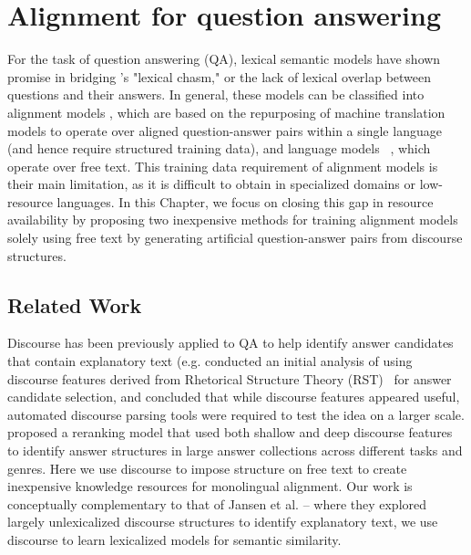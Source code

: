 

\section{Alignment for question answering}
\label{sec-naacl2015:intro}


For the task of question answering (QA), lexical semantic models have shown promise in bridging \citet{Berger:00}'s "lexical chasm," or the lack of lexical overlap between questions and their answers.  In general, these models can be classified into alignment models \citep{echihabi2003noisy,Soricut:06,Riezler:etal:2007,Surdeanu:11,yao2013}, which are based on the repurposing of machine translation models to operate over aligned question-answer pairs within a single language (and hence require structured training data), and language models ~\citep{jansen14,sultan-etal:2014:TACL,yih13}, which operate over free text.  
This training data requirement of alignment models is their main limitation, as it is difficult to obtain in specialized domains or low-resource languages.
In this Chapter, we focus on closing this gap in resource availability by proposing two inexpensive methods for training alignment models solely using free text by generating artificial question-answer pairs from discourse structures. 

\subsection{Related Work}
Discourse has been previously applied to QA to help identify answer candidates that contain explanatory text (e.g. \citet{Verberne:2007}  conducted an initial analysis of using discourse features derived from Rhetorical Structure Theory (RST)~\citep{mann88} for answer candidate selection, and concluded that while discourse features appeared useful, automated discourse parsing tools were required to test the idea on a larger scale.  
\citet{jansen14} proposed a reranking model that used both shallow and deep discourse features to identify answer structures in large answer collections across different tasks and genres.  Here we use discourse to impose structure on free text to create inexpensive knowledge resources for monolingual alignment. Our work is conceptually complementary to that of Jansen et al. -- where they explored largely unlexicalized discourse structures to identify explanatory text, we use discourse to learn lexicalized models for semantic similarity.

